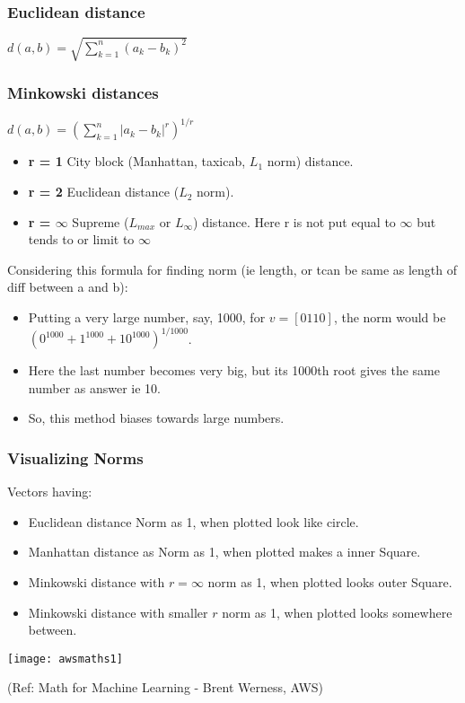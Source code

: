 \begin{frame}[fragile]\frametitle{Euclidean distance} 
$d(a,b) = \sqrt{\sum_{k=1}^{n} (a_k - b_k)^{2}}$
\end{frame}

\begin{frame}[fragile]\frametitle{Minkowski distances}

$d(a,b) = \left(\sum_{k=1}^{n} |a_k - b_k|^{r}\right) ^{1/r}$

	\begin{itemize}
		\item {\bf r = 1} City block (Manhattan, taxicab, $L_{1}$ norm) distance.
		\item {\bf r = 2} Euclidean distance ($L_{2}$ norm).
		\item {\bf r = $\infty$} Supreme ($L_{max}$ or $L_{\infty}$) distance. Here r is not put equal to $\infty$ but tends to or limit to $\infty$
\end{itemize}

Considering this formula for finding norm (ie length, or tcan be same as length of diff between a and b):

	\begin{itemize}
		\item Putting a very large number, say, 1000, for $v=[0 1 10]$, the norm would be $(0^1000 + 1^1000 + 10^1000)^{1/1000}$. 
		\item Here the last number becomes very big, but its 1000th root gives the same number as answer ie 10. 

		\item So, this method biases towards large numbers.
\end{itemize}
		
\end{frame}

\begin{frame}[fragile] \frametitle{Visualizing Norms}


Vectors having:

	\begin{itemize}
		\item Euclidean distance Norm as 1, when plotted look like circle.
		\item Manhattan distance as Norm as 1, when plotted makes a inner Square.
		\item Minkowski distance with $r=\infty$ norm as 1, when plotted looks outer Square.
				\item Minkowski distance with smaller $r$ norm as 1, when plotted looks somewhere between.
\end{itemize}

\begin{center}
\texttt{[image: awsmaths1]}
\end{center}

{\tiny (Ref: Math for Machine Learning - Brent Werness, AWS)}

\end{frame}


